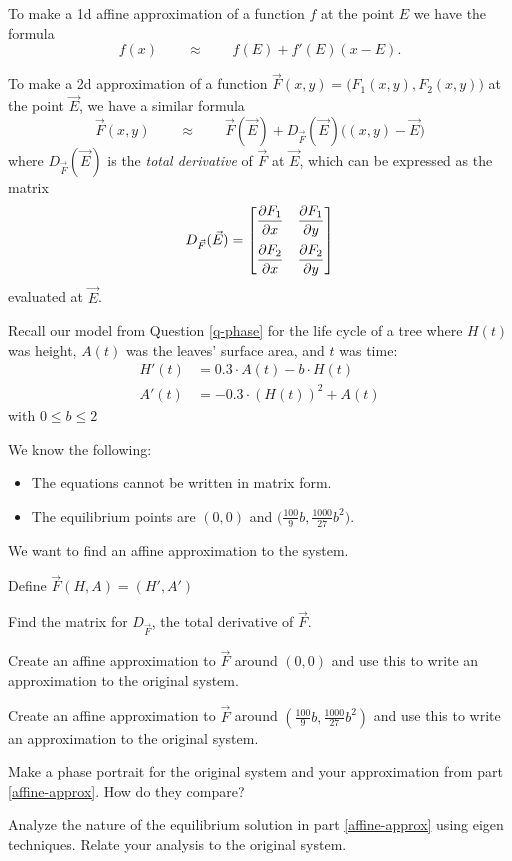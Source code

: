 \documentclass{workbook}
\begin{document}
\begin{slide}
	\question
	To make a 1d affine approximation of a function $f$ at the point $E$ we have the formula
	\[
		f(x)\qquad \approx\qquad f(E) + f'(E)(x-E).
	\]		

	To make a 2d approximation of a function $\vec F(x,y)=\Big(F_1(x,y), F_2(x,y)\Big)$ at the point $\vec E$,
	we have a similar formula
	\[
		\vec F(x,y)\qquad \approx \qquad \vec F(\vec E) + D_{\vec F}(\vec E)\Big((x,y)-\vec E\Big)
	\]
	where $D_{\vec F}(\vec E)$ is the \emph{total derivative} of $\vec F$ at $\vec E$, which can be expressed
	as the matrix
	\[
		D_{\vec F}(\vec E) = \mat{
			\rule[-0.5cm]{0pt}{.8cm}\displaystyle \frac{\partial F_1}{\partial x} &\displaystyle  \frac{\partial F_1}{\partial y}\\
			\rule[-0.2cm]{0pt}{.3cm}\displaystyle  \frac{\partial F_2}{\partial x} &\displaystyle  \frac{\partial F_2}{\partial y}
		}
	\]
	evaluated at $\vec E$.
\end{slide}

\begin{slide}
	
	Recall our model from Question \ref{q-phase} for the life cycle of a tree where $H(t)$ was
	height, $A(t)$ was the leaves' surface area, and $t$ was time:
	\begin{align*}
		H'(t) &= 0.3\cdot A(t)-b\cdot H(t)\\
		A'(t) &= -0.3\cdot (H(t))^2 + A(t)
	\end{align*}
	with $0 \leq b \leq 2$

	\bigskip
	
	We know the following:
	\begin{itemize}
		\item The equations cannot be written in matrix form.
		\item The equilibrium points are $(0,0)$ and $\Big(\frac{100}{9}b,\frac{1000}{27}b^2\Big)$.			
	\end{itemize}	

	We want to find an affine approximation to the system.

	Define $\vec F(H,A)=(H', A')$
	\begin{parts}
		\item Find the matrix for $D_{\vec F}$, the total derivative of $\vec F$.
		\item Create an affine approximation to $\vec F$ around $(0,0)$ and use this to write an approximation to the original system.
		\item\label{affine-approx}
		 Create an affine approximation to $\vec F$ around $(\frac{100}{9}b,\frac{1000}{27}b^2)$ and use this to write an approximation to the original system.
		
		\bigskip 
		\item Make a phase portrait for the original system and your approximation from part \ref{affine-approx}. How do they compare?
		\item Analyze the nature of the equilibrium solution in part \ref{affine-approx} using eigen techniques. Relate your analysis to
		the original system.

	\end{parts}
\end{slide}
\end{document}
